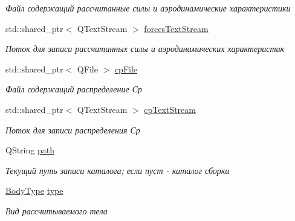 \begin{DoxyCompactItemize}
\begin{DoxyCompactList}\small\item\em Файл содержащий рассчитанные силы и аэродинамические характеристики \end{DoxyCompactList}\item 
\mbox{\label{class_logger_a2944c58779464d845be3d2d46c8a87c5}} 
std\+::shared\+\_\+ptr$<$ Q\+Text\+Stream $>$ \mbox{\hyperlink{class_logger_a2944c58779464d845be3d2d46c8a87c5}{forces\+Text\+Stream}}
\begin{DoxyCompactList}\small\item\em Поток для записи рассчитанных силы и аэродинамических характеристик \end{DoxyCompactList}\item 
\mbox{\label{class_logger_a0323a2c27f2625657918cd814cea2f08}} 
std\+::shared\+\_\+ptr$<$ Q\+File $>$ \mbox{\hyperlink{class_logger_a0323a2c27f2625657918cd814cea2f08}{cp\+File}}
\begin{DoxyCompactList}\small\item\em Файл содержащий распределение Ср \end{DoxyCompactList}\item 
\mbox{\label{class_logger_ab1f8595e3d117762920bbf34e4b91277}} 
std\+::shared\+\_\+ptr$<$ Q\+Text\+Stream $>$ \mbox{\hyperlink{class_logger_ab1f8595e3d117762920bbf34e4b91277}{cp\+Text\+Stream}}
\begin{DoxyCompactList}\small\item\em Поток для записи распределения Ср \end{DoxyCompactList}\item 
\mbox{\label{class_logger_a8ec8e695fda368d431be01800ba5a9c3}} 
Q\+String \mbox{\hyperlink{class_logger_a8ec8e695fda368d431be01800ba5a9c3}{path}}
\begin{DoxyCompactList}\small\item\em Текущий путь записи каталога; если пуст -\/ каталог сборки \end{DoxyCompactList}\item 
\mbox{\label{class_logger_a86b02e737743a180fbdb7747176d00b8}} 
\mbox{\hyperlink{bodyfragmentation_8h_acf0ce63e34327e5bc336f9fe3d2d47a2}{Body\+Type}} \mbox{\hyperlink{class_logger_a86b02e737743a180fbdb7747176d00b8}{type}}
\begin{DoxyCompactList}\small\item\em Вид рассчитываемого тела \end{DoxyCompactList}\end{DoxyCompactItemize}


